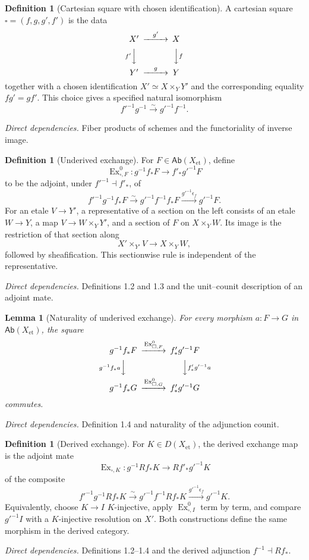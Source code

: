 \documentclass[10pt]{article}
\newtheorem{lemma}[theorem]{Lemma}
\theoremstyle{definition}
\newtheorem{definition}[theorem]{Definition}
\newcommand{\Ab}{\mathsf{Ab}}
\newcommand{\Et}{\mathrm{et}}
\newcommand{\Ex}{\operatorname{Ex}}
\newcommand{\deps}[1]{\par\smallskip\textit{Direct dependencies.} #1\par}
\begin{document}
\begin{definition}[Cartesian square with chosen identification]
A cartesian square $\square=(f,g,g',f')$ is the data
\[
\begin{CD}
 X' @>{g'}>> X\\
 @V{f'}VV @VV{f}V\\
 Y' @>{g}>> Y
\end{CD}
\]
together with a chosen identification $X'\simeq X\times_YY'$ and the
corresponding equality $fg'=gf'$.  This choice gives a specified natural
isomorphism
\[
 f'^{-1}g^{-1}\xrightarrow{\sim}g'^{-1}f^{-1}.
\]
\end{definition}
\deps{Fiber products of schemes and the functoriality of inverse image.}

\begin{definition}[Underived exchange]
For $F\in\Ab(X_{\Et})$, define
\[
 \Ex^0_{\square,F}:g^{-1}f_*F\longrightarrow f'_*g'^{-1}F
\]
to be the adjoint, under $f'^{-1}\dashv f'_*$, of
\[
 f'^{-1}g^{-1}f_*F\xrightarrow{\sim}
 g'^{-1}f^{-1}f_*F\xrightarrow{g'^{-1}\epsilon_f}g'^{-1}F.
\]
For an etale $V\to Y'$, a representative of a section on the left consists
of an etale $W\to Y$, a map $V\to W\times_YY'$, and a section of $F$ on
$X\times_YW$.  Its image is the restriction of that section along
\[
 X'\times_{Y'}V\longrightarrow X\times_YW,
\]
followed by sheafification.  This sectionwise rule is independent of the
representative.
\end{definition}
\deps{Definitions 1.2 and 1.3 and the unit--counit description of an
adjoint mate.}

\begin{lemma}[Naturality of underived exchange]
For every morphism $a:F\to G$ in $\Ab(X_{\Et})$, the square
\[
\begin{CD}
 g^{-1}f_*F @>{\Ex^0_{\square,F}}>> f'_*g'^{-1}F\\
 @V{g^{-1}f_*a}VV @VV{f'_*g'^{-1}a}V\\
 g^{-1}f_*G @>{\Ex^0_{\square,G}}>> f'_*g'^{-1}G
\end{CD}
\]
commutes.
\end{lemma}
\deps{Definition 1.4 and naturality of the adjunction counit.}

\begin{definition}[Derived exchange]
For $K\in D(X_{\Et})$, the derived exchange map is the adjoint mate
\[
 \Ex_{\square,K}:g^{-1}Rf_*K\longrightarrow Rf'_*g'^{-1}K
\]
of the composite
\[
 f'^{-1}g^{-1}Rf_*K\xrightarrow{\sim}
 g'^{-1}f^{-1}Rf_*K\xrightarrow{g'^{-1}\epsilon_f}g'^{-1}K.
\]
Equivalently, choose $K\to I$ $K$-injective, apply
$\Ex^0_{\square,I}$ term by term, and compare $g'^{-1}I$ with a
$K$-injective resolution on $X'$.  Both constructions define the same
morphism in the derived category.
\end{definition}
\deps{Definitions 1.2--1.4 and the derived adjunction
$f^{-1}\dashv Rf_*$.}
\end{document}
